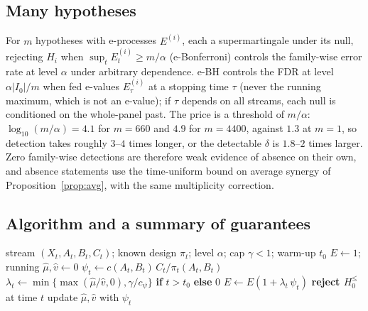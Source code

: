\documentclass[pdflatex,sn-mathphys-ay]{sn-jnl}%
\theoremstyle{thmstyleone}%
\theoremstyle{thmstyletwo}%
\theoremstyle{thmstylethree}%
\begin{document}
\subsection{Many hypotheses}\label{subsec:multi}

For $m$ hypotheses with e-processes $E^{(i)}$, each a supermartingale under its null, rejecting
$H_i$ when $\sup_tE^{(i)}_t\ge m/\alpha$ (e-Bonferroni) controls the family-wise error rate at
level $\alpha$ under arbitrary dependence. e-BH \citep{wang2022} controls the FDR at level
$\alpha|I_0|/m$ when fed e-values $E^{(i)}_\tau$ at a stopping time $\tau$ (never the running
maximum, which is not an e-value); if $\tau$ depends on all streams, each null is conditioned on the
whole-panel past. The price is a threshold of $m/\alpha$: $\log_{10}(m/\alpha)=4.1$ for $m=660$ and
$4.9$ for $m=4400$, against $1.3$ at $m=1$, so detection takes roughly $3$--$4$ times longer, or the detectable
$\delta$ is $1.8$--$2$ times larger. Zero family-wise detections are therefore weak evidence of
absence on their own, and absence statements use the time-uniform bound on average synergy of Proposition~\ref{prop:avg}, with the same multiplicity correction.

\subsection{Algorithm and a summary of guarantees}\label{subsec:algo}

\begin{algorithm}[h]
\caption{Interventional ANTE (one-sided)}\label{algo:ante}
\begin{algorithmic}[1]
\Require stream $(X_t,A_t,B_t,C_t)$; known design $\pi_t$; level $\alpha$; cap $\gamma<1$; warm-up $t_0$
\State $E\gets1$; running $\hat\mu,\hat v\gets0$
  \State $\psi_t\gets c(A_t,B_t)\,C_t/\pi_t(A_t,B_t)$ 
  \State $\lambda_t\gets \min\{\max(\hat\mu/\hat v,0),\gamma/c_\psi\}$ \textbf{if} $t>t_0$ \textbf{else} $0$ 
  \State $E\gets E(1+\lambda_t\,\psi_t)$
   \Return \textbf{reject $H_0^{\le}$} at time $t$ \EndIf
  \State update $\hat\mu,\hat v$ with $\psi_t$
\EndFor
\end{algorithmic}
\end{algorithm}
\end{document}
